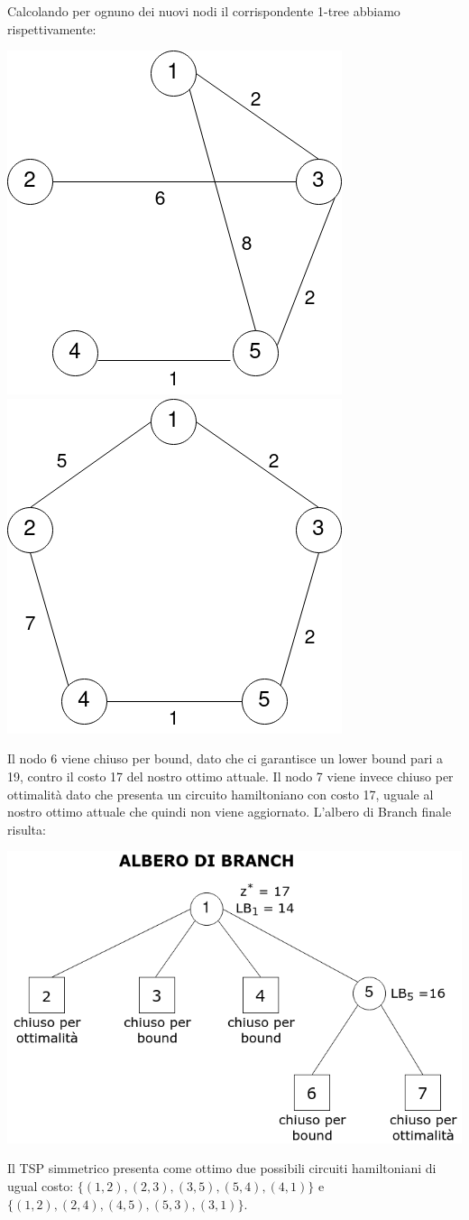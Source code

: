 \documentclass[
	article,			%
	12pt,				%
	oneside,			%
	a4paper,			%
	english,			%
	italian,				%
	sumario=tradicional,
	]{abntex2}
\begin{document}
Calcolando per ognuno dei nuovi nodi il corrispondente 1-tree abbiamo rispettivamente:
\begin{center}
    \includegraphics[scale=0.33]{files/sesto1Tree.png}
    \qquad
    \qquad
    \includegraphics[scale=0.33]{files/settimo1Tree.png}
\end{center}
Il nodo 6 viene chiuso per bound, dato che ci garantisce un lower bound pari a 19, contro il costo 17 del nostro ottimo attuale. Il nodo 7 viene invece chiuso per ottimalità dato che presenta un circuito hamiltoniano con costo 17, uguale al nostro ottimo attuale che quindi non viene aggiornato. L'albero di Branch finale risulta:
\begin{center}
    \includegraphics[scale=0.4]{files/alberoBranch3.png}
\end{center}
Il TSP simmetrico presenta come ottimo due possibili circuiti hamiltoniani di ugual costo: $\{(1,2),(2,3),(3,5),(5,4),(4,1)\}$ e $\{(1,2),(2,4),(4,5),(5,3),(3,1)\}$.
\end{document}
